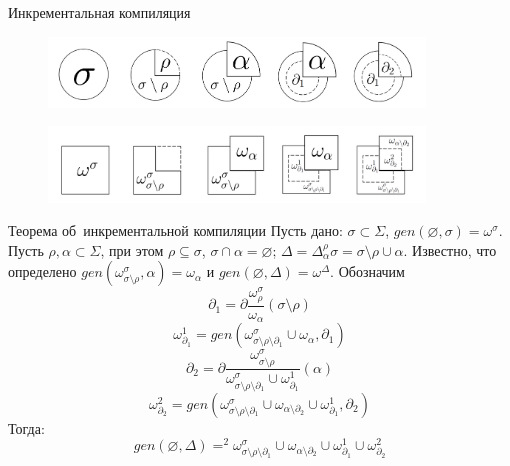 \begin{frame}{Инкрементальная компиляция}
\begin{figure}[!h]
	\centering
	\includegraphics[width=100mm]{theorem1_src.png}
\end{figure}

\begin{figure}[!h]
	\centering
	\includegraphics[width=100mm]{theorem1_dst.png}
\end{figure}
\end{frame}

\newcommand{\butpartial}{{\sigma\setminus\rho\setminus\partial_1}}
\newcommand{\butpartialA}{{\alpha\setminus{\partial_2}}}
\newcommand{\sigmanoro}{{\sigma\setminus\rho}}

\begin{frame}{Теорема об~инкрементальной компиляции}
Пусть дано: $\sigma \subset \Sigma$, $gen(\varnothing, \sigma) = \omega^\sigma$. Пусть $\rho, \alpha \subset \Sigma$, при этом $\rho \subseteq \sigma$, $\sigma \cap \alpha = \varnothing$; $\Delta = \Delta^\rho_\alpha\sigma = \sigma\setminus\rho\cup\alpha$. Известно, что определено $gen(\omega^\sigma_{\sigma\setminus\rho}, \alpha) = \omega_\alpha$ и $gen(\varnothing, \Delta) = \omega^\Delta$.
Обозначим 
$$\partial_1 = \partial\dfrac{\omega^\sigma_\rho}{\omega_\alpha}(\sigma\setminus\rho)$$
$$\omega^1_{\partial_1} = gen(\omega^\sigma_{\butpartial} \cup \omega_\alpha, \partial_1)$$
$$\partial_2 = \partial\dfrac{\omega^\sigma_{\sigma\setminus\rho}}{\omega^\sigma_{\butpartial} \cup \omega^1_{\partial_1}}(\alpha)$$
$$\omega^2_{\partial_2} = gen(\omega^\sigma_{\butpartial} \cup \omega_{\butpartialA} \cup \omega^1_{\partial_1}, \partial_2)$$
Тогда:
$$gen(\varnothing, \Delta) =^2 \omega^\sigma_{\butpartial} \cup \omega_{\butpartialA} \cup \omega^1_{\partial_1} \cup \omega^2_{\partial_2}$$

\end{frame}

